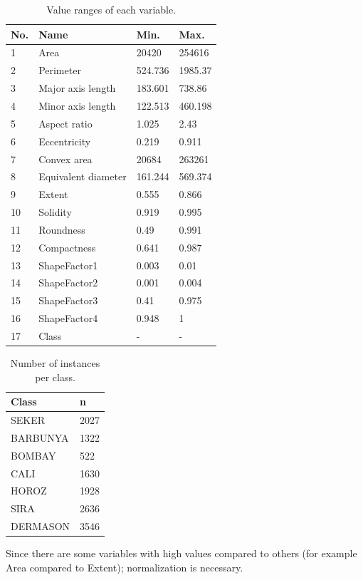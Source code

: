 \documentclass[a4paper,11pt]{article}
\begin{document}
\begin{table}[h]
\centering
\begin{tabular}{||l|l|l|l||}
	\hline
	No. & Name & Min. & Max.\\
	\hline
	1 & Area & 20420 & 254616\\
	2 & Perimeter & 524.736 & 1985.37\\
	3 & Major axis length & 183.601 & 738.86\\
	4 & Minor axis length & 122.513 & 460.198\\
	5 & Aspect ratio & 1.025 & 2.43\\
	6 & Eccentricity & 0.219 & 0.911\\
	7 & Convex area & 20684 & 263261\\
	8 & Equivalent diameter & 161.244 & 569.374\\
	9 & Extent & 0.555 & 0.866\\
	10 & Solidity & 0.919 & 0.995\\
	11 & Roundness & 0.49 & 0.991\\
	12 & Compactness & 0.641 & 0.987\\
	13 & ShapeFactor1 & 0.003 & 0.01\\
	14 & ShapeFactor2 & 0.001 & 0.004\\
	15 & ShapeFactor3 & 0.41 & 0.975\\
	16 & ShapeFactor4 & 0.948 & 1\\
	17 & Class & - & -\\
	\hline
\end{tabular}
\caption{Value ranges of each variable.}
\label{tab:table1}
\end{table}

\begin{table}[h]
\centering
\begin{tabular}{||l|l||}
	\hline
	Class & n\\
	\hline
	SEKER & 2027\\
	BARBUNYA & 1322\\
	BOMBAY & 522\\
	CALI & 1630\\
	HOROZ & 1928\\
	SIRA & 2636\\
	DERMASON & 3546\\
	\hline
\end{tabular}
\caption{Number of instances per class.}
\label{tab:table2}
\end{table}

Since there are some variables with high values compared to others (for example Area compared to Extent); normalization is necessary.
\end{document}
